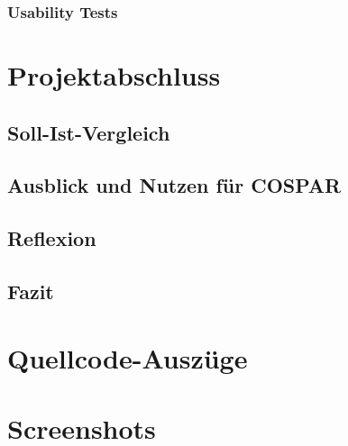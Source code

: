 \documentclass[11pt,a4paper]{article}
\begin{document}
\subsubsection{Usability Tests}

\newpage
\section{Projektabschluss}

\subsection{Soll-Ist-Vergleich}

\subsection{Ausblick und Nutzen für COSPAR}

\subsection{Reflexion}

\subsection{Fazit}

\appendix

\section{Quellcode-Auszüge}

\section{Screenshots}
\end{document}
